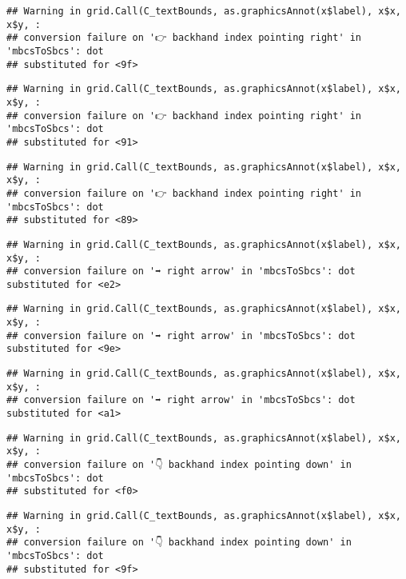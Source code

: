 \documentclass[
]{article}
\begin{document}
\begin{verbatim}
## Warning in grid.Call(C_textBounds, as.graphicsAnnot(x$label), x$x, x$y, :
## conversion failure on '👉 backhand index pointing right' in 'mbcsToSbcs': dot
## substituted for <9f>
\end{verbatim}

\begin{verbatim}
## Warning in grid.Call(C_textBounds, as.graphicsAnnot(x$label), x$x, x$y, :
## conversion failure on '👉 backhand index pointing right' in 'mbcsToSbcs': dot
## substituted for <91>
\end{verbatim}

\begin{verbatim}
## Warning in grid.Call(C_textBounds, as.graphicsAnnot(x$label), x$x, x$y, :
## conversion failure on '👉 backhand index pointing right' in 'mbcsToSbcs': dot
## substituted for <89>
\end{verbatim}

\begin{verbatim}
## Warning in grid.Call(C_textBounds, as.graphicsAnnot(x$label), x$x, x$y, :
## conversion failure on '➡ right arrow' in 'mbcsToSbcs': dot substituted for <e2>
\end{verbatim}

\begin{verbatim}
## Warning in grid.Call(C_textBounds, as.graphicsAnnot(x$label), x$x, x$y, :
## conversion failure on '➡ right arrow' in 'mbcsToSbcs': dot substituted for <9e>
\end{verbatim}

\begin{verbatim}
## Warning in grid.Call(C_textBounds, as.graphicsAnnot(x$label), x$x, x$y, :
## conversion failure on '➡ right arrow' in 'mbcsToSbcs': dot substituted for <a1>
\end{verbatim}

\begin{verbatim}
## Warning in grid.Call(C_textBounds, as.graphicsAnnot(x$label), x$x, x$y, :
## conversion failure on '👇 backhand index pointing down' in 'mbcsToSbcs': dot
## substituted for <f0>
\end{verbatim}

\begin{verbatim}
## Warning in grid.Call(C_textBounds, as.graphicsAnnot(x$label), x$x, x$y, :
## conversion failure on '👇 backhand index pointing down' in 'mbcsToSbcs': dot
## substituted for <9f>
\end{verbatim}
\end{document}
